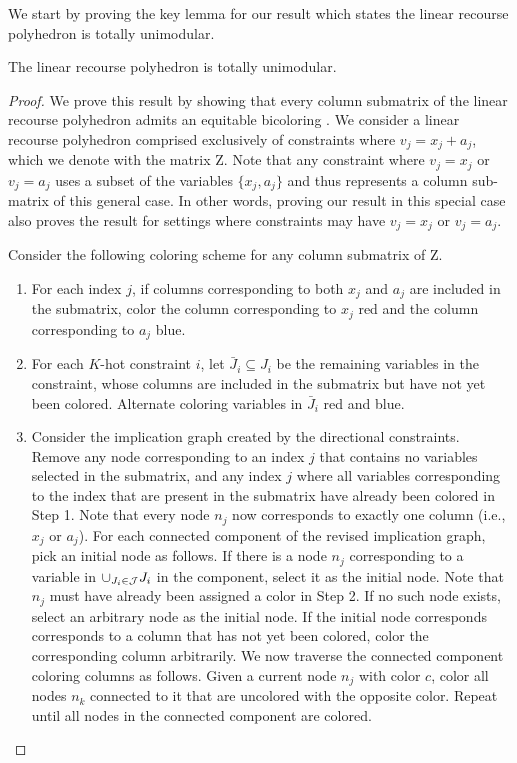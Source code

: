 We start by proving the key lemma for our result which states the linear recourse polyhedron is totally unimodular.
\begin{lemma} \label{lemma:tum}
    The linear recourse polyhedron is totally unimodular.
\end{lemma}
\begin{proof}
We prove this result by showing that every column submatrix of the linear recourse polyhedron admits an equitable bicoloring \citep{Ipref}. We consider a linear recourse polyhedron comprised exclusively of constraints where $v_j = x_j + a_j$, which we denote with the matrix Z. Note that any constraint where $v_j = x_j$ or $v_j = a_j$ uses a subset of the variables $\{x_j, a_j\}$ and thus represents a column sub-matrix of this general case. In other words, proving our result in this special case also proves the result for settings where constraints may have $v_j = x_j$ or $v_j = a_j$.

Consider the following coloring scheme for any column submatrix of Z. 
\begin{enumerate}
\item For each index $j$, if columns corresponding to both $x_j$ and $a_j$ are included in the submatrix, color the column corresponding to $x_j$ red and the column corresponding to $a_j$ blue. 

\item For each $K$-hot constraint $i$, let $\bar{J}_i \subseteq J_i$ be the remaining variables in the constraint, whose columns are included in the submatrix but have not yet been colored. Alternate coloring variables in $\bar{J}_i$ red and blue.

\item Consider the implication graph created by the directional constraints. Remove any node corresponding to an index $j$ that contains no variables selected in the submatrix, and any index $j$ where all variables corresponding to the index that are present in the submatrix have already been colored in Step 1. Note that every node $n_j$ now corresponds to exactly one column (i.e., $x_j$ or $a_j$). For each connected component of the revised implication graph, pick an initial node as follows. If there is a node $n_j$ corresponding to a variable in $\cup_{J_i \in {\cal J}} J_i $ in the component, select it as the initial node. Note that $n_j$ must have already been assigned a color in Step 2. If no such node exists, select an arbitrary node as the initial node. If the initial node corresponds corresponds to a column that has not yet been colored, color the corresponding column arbitrarily. We now traverse the connected component coloring columns as follows. Given a current node $n_j$ with color $c$, color all nodes $n_k$ connected to it that are uncolored with the opposite color. Repeat until all nodes in the connected component are colored.


\end{enumerate}
\end{proof}
